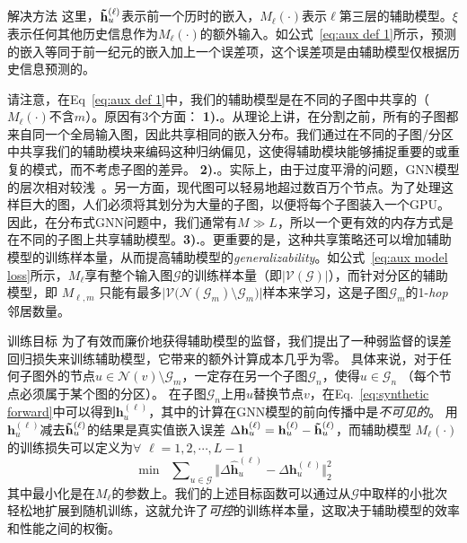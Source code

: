 \begin{section}{解决方法}
    这里，$\mathbf{\Tilde{h}}^{(\ell)}_u$表示前一个历时的嵌入，$M_{\ell}(\cdot)$表示$\ell$第三层的辅助模型。$\xi$表示任何其他历史信息作为$M_{\ell}(\cdot)$的额外输入。如公式~\ref{eq:aux def 1}所示，预测的嵌入等同于前一纪元的嵌入加上一个误差项，这个误差项是由辅助模型仅根据历史信息预测的。

    请注意，在Eq~\ref{eq:aux def 1}中，我们的辅助模型是在不同的子图中共享的（$M_{\ell}(\cdot)$不含$m$）。原因有3个方面： \textbf{1).}。从理论上讲，在分割之前，所有的子图都来自同一个全局输入图，因此共享相同的嵌入分布。我们通过在不同的子图/分区中共享我们的辅助模块来编码这种归纳偏见，这使得辅助模块能够捕捉重要的或重复的模式，而不考虑子图的差异。 \textbf{2).}。实际上，由于过度平滑的问题，GNN模型的层次相对较浅~\cite{chen2020measuring}。另一方面，现代图可以轻易地超过数百万个节点。为了处理这样巨大的图，人们必须将其划分为大量的子图，以便将每个子图装入一个GPU。因此，在分布式GNN问题中，我们通常有$M\gg L$，所以一个更有效的内存方式是在不同的子图上共享辅助模型。\textbf{3).}。更重要的是，这种共享策略还可以增加辅助模型的训练样本量，从而提高辅助模型的\emph{generalizability}。如公式~\ref{eq:aux model loss}所示，$M_{\ell}$享有整个输入图$\mathcal{G}$的训练样本量（即$\vert\mathcal{V}(\mathcal{G})\vert$），而针对分区的辅助模型，即 $M_{\ell,m}$ 只能有最多$\big\vert\mathcal{V}\big(\mathcal{N}(\mathcal{G}_{m}) \setminus \mathcal{G}_{m}\big)\big\vert$样本来学习，这是子图$\mathcal{G}_m$的1-\emph{hop}邻居数量。


    \begin{subsection}{训练目标}
        为了有效而廉价地获得辅助模型的监督，我们提出了一种弱监督的误差回归损失来训练辅助模型，它带来的额外计算成本几乎为零。
        具体来说，对于任何子图外的节点$u \in \mathcal{N}(v) \setminus \mathcal{G}_{m}$，一定存在另一个子图$\mathcal{G}_{n}$，使得$u \in \mathcal{G}_{n}$ （每个节点必须属于某个图的分区）。
        在子图$\mathcal{G}_{n}$上用$u$替换节点$v$，在Eq.~\ref{eq:synthetic forward}中可以得到$\mathbf{h}_{u}^{(\ell)}$，其中的计算在GNN模型的前向传播中是\emph{不可见的}。
        用$\mathbf{h}_{u}^{(\ell)}$减去$\mathbf{\Tilde{h}}^{(\ell)}_u$的结果是真实值嵌入误差 $\Delta\mathbf{h}^{(\ell)}_u = \mathbf{h}_{u}^{(\ell)} - \mathbf{\Tilde{h}}^{(\ell)}_u$，而辅助模型 $M_{\ell}(\cdot)$的训练损失可以定义为$\forall$ $\ell=1,2,\cdots,L-1$
        \begin{equation}
            \min\;\; \sum\nolimits_{u\in\mathcal{G}} \big\Vert \Delta\mathbf{\hat{h}}^{(\ell)}_u - \Delta\textbf{h}^{(\ell)}_u \big\Vert_{2}^{2}
        \label{eq:aux model loss}
        \end{equation}
        其中最小化是在$M_{\ell}$的参数上。我们的上述目标函数可以通过从$\mathcal{G}$中取样的小批次轻松地扩展到随机训练，这就允许了\emph{可控}的训练样本量，这取决于辅助模型的效率和性能之间的权衡。
    \end{subsection}


\end{section}
